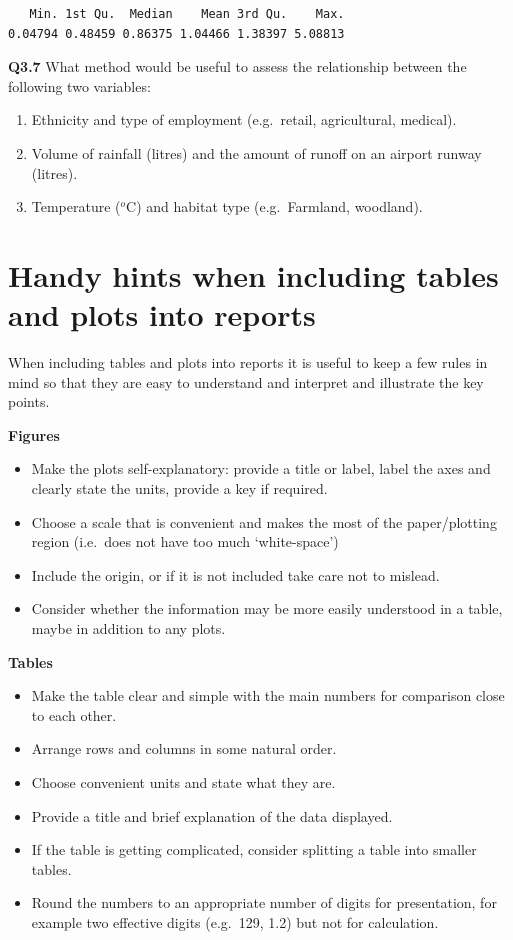 \documentclass[
  oneside]{krantz}
\begin{document}
\begin{verbatim}
   Min. 1st Qu.  Median    Mean 3rd Qu.    Max. 
0.04794 0.48459 0.86375 1.04466 1.38397 5.08813 
\end{verbatim}

\textbf{Q3.7} What method would be useful to assess the relationship between the following two variables:

\begin{enumerate}
\def\labelenumi{\alph{enumi}.}
\item
  Ethnicity and type of employment (e.g.~retail, agricultural, medical).
\item
  Volume of rainfall (litres) and the amount of runoff on an airport runway (litres).
\item
  Temperature (\(^o\)C) and habitat type (e.g.~Farmland, woodland).
\end{enumerate}

\hypertarget{handy-hints-when-including-tables-and-plots-into-reports}{%
\section{Handy hints when including tables and plots into reports}\label{handy-hints-when-including-tables-and-plots-into-reports}}

When including tables and plots into reports it is useful to keep a few rules in mind so that they are easy to understand and interpret and illustrate the key points.

\textbf{Figures}

\begin{itemize}
\item
  Make the plots self-explanatory: provide a title or label, label the axes and clearly state the units, provide a key if required.
\item
  Choose a scale that is convenient and makes the most of the paper/plotting region (i.e.~does not have too much `white-space')
\item
  Include the origin, or if it is not included take care not to mislead.
\item
  Consider whether the information may be more easily understood in a table, maybe in addition to any plots.
\end{itemize}

\textbf{Tables}

\begin{itemize}
\item
  Make the table clear and simple with the main numbers for comparison close to each other.
\item
  Arrange rows and columns in some natural order.
\item
  Choose convenient units and state what they are.
\item
  Provide a title and brief explanation of the data displayed.
\item
  If the table is getting complicated, consider splitting a table into smaller tables.
\item
  Round the numbers to an appropriate number of digits for presentation, for example two effective digits (e.g.~129, 1.2) but not for calculation.
\end{itemize}
\end{document}
